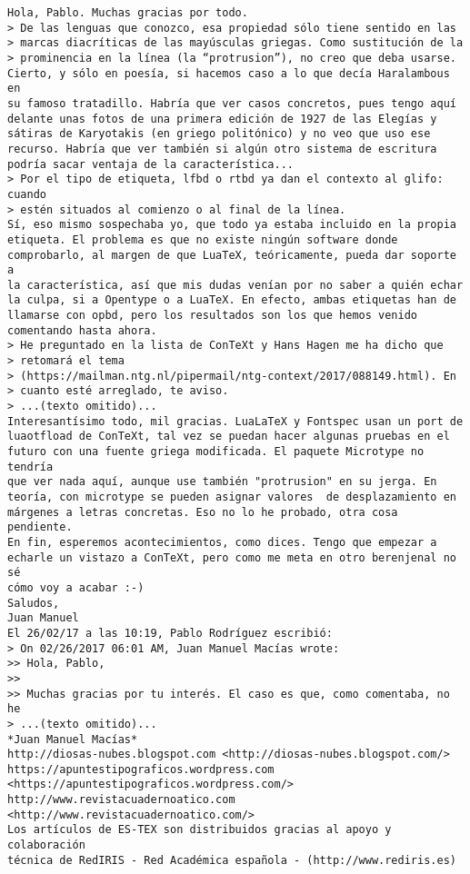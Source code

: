 \documentclass[a4paper,10pt]{article}
\begin{document}
\begin{lstlisting}
Hola, Pablo. Muchas gracias por todo.
> De las lenguas que conozco, esa propiedad sólo tiene sentido en las
> marcas diacríticas de las mayúsculas griegas. Como sustitución de la
> prominencia en la línea (la “protrusion”), no creo que deba usarse.
Cierto, y sólo en poesía, si hacemos caso a lo que decía Haralambous en
su famoso tratadillo. Habría que ver casos concretos, pues tengo aquí
delante unas fotos de una primera edición de 1927 de las Elegías y
sátiras de Karyotakis (en griego politónico) y no veo que uso ese
recurso. Habría que ver también si algún otro sistema de escritura
podría sacar ventaja de la característica...
> Por el tipo de etiqueta, lfbd o rtbd ya dan el contexto al glifo: cuando
> estén situados al comienzo o al final de la línea.
Sí, eso mismo sospechaba yo, que todo ya estaba incluido en la propia
etiqueta. El problema es que no existe ningún software donde
comprobarlo, al margen de que LuaTeX, teóricamente, pueda dar soporte a
la característica, así que mis dudas venían por no saber a quién echar
la culpa, si a Opentype o a LuaTeX. En efecto, ambas etiquetas han de
llamarse con opbd, pero los resultados son los que hemos venido
comentando hasta ahora.
> He preguntado en la lista de ConTeXt y Hans Hagen me ha dicho que
> retomará el tema
> (https://mailman.ntg.nl/pipermail/ntg-context/2017/088149.html). En
> cuanto esté arreglado, te aviso.
> ...(texto omitido)...
Interesantísimo todo, mil gracias. LuaLaTeX y Fontspec usan un port de
luaotfload de ConTeXt, tal vez se puedan hacer algunas pruebas en el
futuro con una fuente griega modificada. El paquete Microtype no tendría
que ver nada aquí, aunque use también "protrusion" en su jerga. En
teoría, con microtype se pueden asignar valores  de desplazamiento en
márgenes a letras concretas. Eso no lo he probado, otra cosa pendiente.
En fin, esperemos acontecimientos, como dices. Tengo que empezar a
echarle un vistazo a ConTeXt, pero como me meta en otro berenjenal no sé
cómo voy a acabar :-)
Saludos,
Juan Manuel
El 26/02/17 a las 10:19, Pablo Rodríguez escribió:
> On 02/26/2017 06:01 AM, Juan Manuel Macías wrote:
>> Hola, Pablo,
>>
>> Muchas gracias por tu interés. El caso es que, como comentaba, no he
> ...(texto omitido)...
*Juan Manuel Macías*
http://diosas-nubes.blogspot.com <http://diosas-nubes.blogspot.com/>
https://apuntestipograficos.wordpress.com
<https://apuntestipograficos.wordpress.com/>
http://www.revistacuadernoatico.com <http://www.revistacuadernoatico.com/>
Los artículos de ES-TEX son distribuidos gracias al apoyo y colaboración 
técnica de RedIRIS - Red Académica española - (http://www.rediris.es)

\end{lstlisting}
\end{document}
